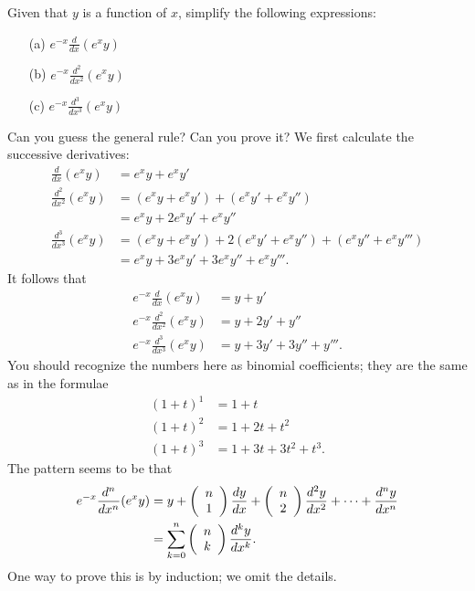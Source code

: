 \documentclass[a4paper]{book}
\theoremstyle{definition}
\newenvironment{starex}{
 \renewcommand{\thetheorem}{\arabic{chapter}.\arabic{section}.\arabic{theorem}${}^*$}
 \exercise
}{\endexercise}
\renewenvironment{solution}{\SolutionInline}{\endSolutionInline}
\begin{document}
\begin{starex}
 Given that $y$ is a function of $x$, simplify the following expressions:
 \begin{itemize}
  \item[(a)] $e^{-x}\frac{d}{dx}(e^x y)$ 
  \item[(b)] $e^{-x}\frac{d^2}{dx^2}(e^x y)$ 
  \item[(c)] $e^{-x}\frac{d^3}{dx^3}(e^x y)$ 
 \end{itemize}
 Can you guess the general rule?  Can you prove it?
\end{starex}
\begin{solution}
 We first calculate the successive derivatives:
 \begin{align*}
  \frac{d}{dx}(e^x y) &=
   e^x y + e^x y' \\ 
  \frac{d^2}{dx^2}(e^x y) &= 
   (e^x y + e^x y') + (e^x y' + e^x y'') \\
   &= e^x y + 2 e^x y' + e^x y'' \\
  \frac{d^3}{dx^3}(e^x y) &= 
   (e^x y + e^x y') + 2(e^x y' + e^x y'') + (e^x y'' + e^x y''') \\
   &= e^x y + 3 e^x y' + 3 e^x y'' + e^x y'''.
 \end{align*}
 It follows that
 \begin{align*}
  e^{-x}\frac{d}{dx}(e^x y)     &= y + y' \\
  e^{-x}\frac{d^2}{dx^2}(e^x y) &= y + 2y' + y'' \\
  e^{-x}\frac{d^3}{dx^3}(e^x y) &= y + 3y' + 3y'' + y'''.
 \end{align*}
 You should recognize the numbers here as binomial coefficients; they
 are the same as in the formulae
 \begin{align*}
  (1+t)^1 &= 1 + t \\
  (1+t)^2 &= 1 + 2t + t^2 \\
  (1+t)^3 &= 1 + 3t + 3t^2 + t^3.
 \end{align*}
 The pattern seems to be that
 \begin{align*}
  e^{-x}\frac{d^n}{dx^n}(e^x y) &= 
   y + \left(\begin{array}{c}{n}\\{1}\end{array}\right) \frac{dy}{dx} + \left(\begin{array}{c}{n}\\{2}\end{array}\right) \frac{d^2y}{dx^2} + 
    \cdots + \frac{d^ny}{dx^n} \\
   &= \sum_{k=0}^n \left(\begin{array}{c}{n}\\{k}\end{array}\right) \frac{d^ky}{dx^k}.
 \end{align*}
 One way to prove this is by induction; we omit the details.  


\end{solution}
\end{document}

